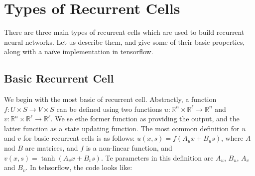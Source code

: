 \documentclass[10pt]{amsart}
\newcommand{\R}{\mathbb{R}}
\theoremstyle{definition}
\begin{document}




\section{Types of Recurrent Cells}

There are three main types of recurrent cells which are used to build recurrent neural networks.  Let us describe them, and give some of their basic properties, along with a na\"ive implementation in tensorflow.

\subsection{Basic Recurrent Cell} We begin with the most basic of recurrent cell. Abstractly, a function $f:U\times S\to V\times S$ can be defined using two functions $u:\R^n\times \R^\ell\to \R^n$ and $v:\R^n\times\R^\ell \to \R^\ell$. We se ethe former function as providing the output, and the latter function as a state updating function.  The most common definition for $u$ and $v$ for basic recurrent cells is as follows: $u(x, s) = f(A_ux+B_us)$, where $A$ nad $B$ are matrices, and $f$ is a non-linear function, and $v(x, s) = \tanh(A_vx+B_vs)$. Te parameters in this definition are $A_u$, $B_u$, $A_v$ and $B_v$. In tehsorflow, the code looks like:
\end{document}
